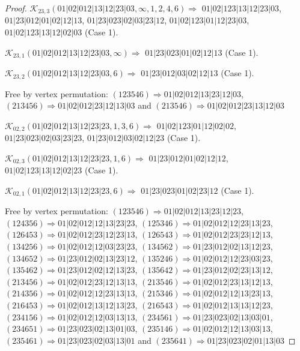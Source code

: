\documentclass[12pt]{article}
\theoremstyle{plain}
\theoremstyle{definition}
\theoremstyle{remark}
\newcommand{\fancy}[1]{\mathcal{#1}}
\def\K{\fancy{K}}
\begin{document}
\begin{proof}
	
	
	\bigskip
	
	$\K_{23,3}(01|02|012|13|12|23|03,\infty,1, 2, 4, 6)\Rightarrow $ $01|02|123|13|12|23|03$, $01|23|012|01|02|12|13$, $01|23|023|02|03|23|12$, $01|02|123|01|12|23|03$, $01|02|123|13|12|02|03$ (Case 1).
	
	$\K_{23,1}(01|02|012|13|12|23|03,\infty)\Rightarrow $ $01|23|023|01|02|12|13$ (Case 1).
	
	$\K_{23,2}(01|02|012|13|12|23|03,6)\Rightarrow $ $01|23|012|03|02|12|13$ (Case 1).
	
	
	
	Free by vertex permutation: $(1 2 3 5 4 6)\Rightarrow 01|02|012|13|23|12|03$, $(2 1 3 4 5 6)\Rightarrow 01|02|012|23|12|13|03$ and $(2 1 3 5 4 6)\Rightarrow 01|02|012|23|13|12|03$
	
	
	
	\bigskip
	
	$\K_{02,2}(01|02|012|13|12|23|23,1, 3, 6)\Rightarrow $ $01|02|123|01|12|02|02$, $01|23|023|02|03|23|23$, $01|23|012|03|02|12|23$ (Case 1).
	
	$\K_{02,3}(01|02|012|13|12|23|23,1, 6)\Rightarrow $ $01|23|012|01|02|12|12$, $01|02|123|13|12|02|23$ (Case 1).
	
	$\K_{02,1}(01|02|012|13|12|23|23,6)\Rightarrow $ $01|23|023|01|02|23|12$ (Case 1).
	
	
	
	Free by vertex permutation: $(1 2 3 5 4 6)\Rightarrow 01|02|012|13|23|12|23$, $(1 2 4 3 5 6)\Rightarrow 01|02|012|12|13|23|23$, $(1 2 5 3 4 6)\Rightarrow 01|02|012|12|23|13|23$, $(1 2 6 4 5 3)\Rightarrow 01|02|012|23|12|23|13$, $(1 2 6 5 4 3)\Rightarrow 01|02|012|23|23|12|13$, $(1 3 4 2 5 6)\Rightarrow 01|02|012|12|03|23|23$, $(1 3 4 5 6 2)\Rightarrow 01|23|012|02|13|12|23$, $(1 3 4 6 5 2)\Rightarrow 01|23|012|02|13|23|12$, $(1 3 5 2 4 6)\Rightarrow 01|02|012|12|23|03|23$, $(1 3 5 4 6 2)\Rightarrow 01|23|012|02|12|13|23$, $(1 3 5 6 4 2)\Rightarrow 01|23|012|02|23|13|12$, $(2 1 3 4 5 6)\Rightarrow 01|02|012|23|12|13|13$, $(2 1 3 5 4 6)\Rightarrow 01|02|012|23|13|12|13$, $(2 1 4 3 5 6)\Rightarrow 01|02|012|12|23|13|13$, $(2 1 5 3 4 6)\Rightarrow 01|02|012|12|13|23|13$, $(2 1 6 4 5 3)\Rightarrow 01|02|012|13|12|13|23$, $(2 1 6 5 4 3)\Rightarrow 01|02|012|13|13|12|23$, $(2 3 4 1 5 6)\Rightarrow 01|02|012|12|03|13|13$, $(2 3 4 5 6 1)\Rightarrow 01|23|023|02|13|03|01$, $(2 3 4 6 5 1)\Rightarrow 01|23|023|02|13|01|03$, $(2 3 5 1 4 6)\Rightarrow 01|02|012|12|13|03|13$, $(2 3 5 4 6 1)\Rightarrow 01|23|023|02|03|13|01$ and $(2 3 5 6 4 1)\Rightarrow 01|23|023|02|01|13|03$
	

\end{proof}
\end{document}
